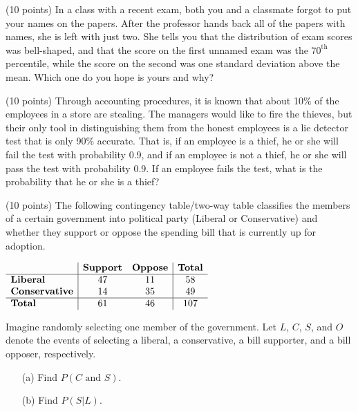 \documentclass[12pt]{amsart}
\begin{document}
\newpage

\begin{thm} (10 points) In a class with a recent exam, both you and a classmate forgot to put your names on the papers.  After the professor hands back all of the papers with names, she is left with just two.  She tells you that the distribution of exam scores was bell-shaped, and that the score on the first unnamed exam was the $70^{\text{th}}$ percentile, while the score on the second was one standard deviation above the mean.  Which one do you hope is yours and why?
\end{thm}

\vspace{3in}

\begin{thm} (10 points) Through accounting procedures, it is known that about 10\% of the employees in a store are stealing.  The managers would like to fire the thieves, but their only tool in distinguishing them from the honest employees is a lie detector test that is only 90\% accurate.  That is, if an employee is a thief, he or she will fail the test with probability 0.9, and if an employee is not a thief, he or she will pass the test with probability 0.9.  If an employee fails the test, what is the probability that he or she is a thief?
\end{thm}

\newpage

\begin{thm} (10 points) The following contingency table/two-way table classifies the members of a certain government into political party (Liberal or Conservative) and whether they support or oppose the spending bill that is currently up for adoption.
\begin{center}
$\begin{array}{l|cc|c}
& {\text{\bf Support}} & {\text{\bf Oppose}} & {\text{\bf Total}}\\ \hline
{\text{\bf Liberal}} & 47 & 11 & 58 \\
{\text{\bf Conservative}} & 14 & 35 & 49\\ \hline
{\text{\bf Total}} & 61 & 46 & 107\\
\end{array}$
\end{center}
Imagine randomly selecting one member of the government.  Let $L$, $C$, $S$, and $O$ denote the events of selecting a liberal, a conservative, a bill supporter, and a bill opposer, respectively.  
\begin{itemize}
\item[(a)]  Find $P(C{\text{ and }}S)$.
\vspace{1in}
\item[(b)] Find $P(S\vert L)$.
\end{itemize}
\end{thm}
\end{document}
